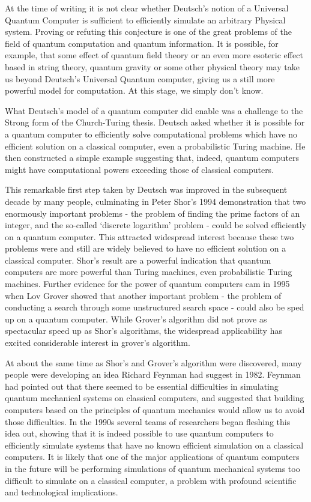 \documentclass[12pt, oneside]{book}
\theoremstyle{definition}
\theoremstyle{definition}
\theoremstyle{remark}
\begin{document}
At the time of writing it is not clear whether Deutsch's notion of a Universal Quantum Computer is sufficient to efficiently simulate an arbitrary Physical system. Proving or refuting this conjecture is one of the great problems of the field of quantum computation and quantum information. It is possible, for example, that some effect of quantum field theory or an even more esoteric effect based in string theory, quantum gravity or some other physical theory may take us beyond Deutsch's Universal Quantum computer, giving us a still more powerful model for computation. At this stage, we simply don't know.

What Deutsch's model of a quantum computer did enable was a challenge to the Strong form of the Church-Turing thesis. Deutsch asked whether it is possible for a quantum computer to efficiently solve computational problems which have no efficient solution on a classical computer, even a probabilistic Turing machine. He then constructed a simple example suggesting that, indeed, quantum computers might have computational powers exceeding those of classical computers.

This remarkable first step taken by Deutsch was improved in the subsequent decade by many people, culminating in Peter Shor's 1994 demonstration that two enormously important problems - the problem of finding the prime factors of an integer, and the so-called `discrete logarithm' problem - could be solved efficiently on a quantum computer. This attracted widespread interest because these two problems were and still are widely believed to have no efficient solution on a classical computer. Shor's result are a powerful indication that quantum computers are more powerful than Turing machines, even probabilistic Turing machines. Further evidence for the power of quantum computers cam in 1995 when Lov Grover showed that another important problem - the problem of conducting a search through some unstructured search space - could also be sped up on a quantum computer. While Grover's algorithm did not prove as spectacular speed up as Shor's algorithms, the widespread applicability has excited considerable interest in grover's algorithm.

At about the same time as Shor's and Grover's algorithm were discovered, many people were developing an idea Richard Feynman had suggest in 1982. Feynman had pointed out that there seemed to be essential difficulties in simulating quantum mechanical systems on classical computers, and suggested that building computers based on the principles of quantum mechanics would allow us to avoid those difficulties. In the 1990s several teams of researchers began fleshing this idea out, showing that it is indeed possible to use quantum computers to efficiently simulate systems that have no known efficient simulation on a classical computers. It is likely that one of the major applications of quantum computers in the future will be performing simulations of quantum mechanical systems too difficult to simulate on a classical computer, a problem with profound scientific and technological implications.
\end{document}
